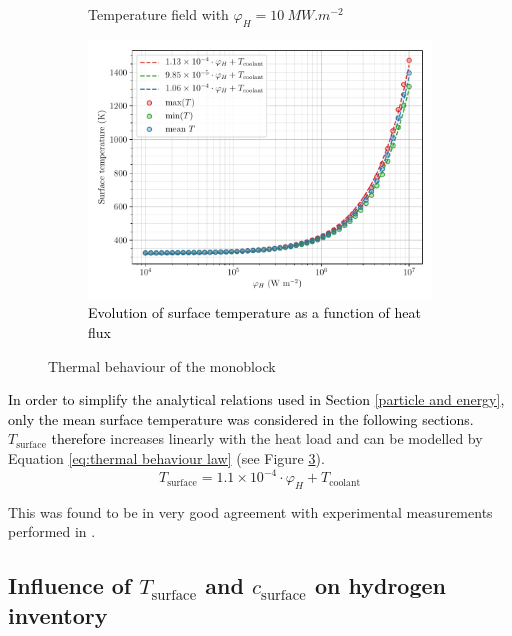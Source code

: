 \begin{figure} [h!]
\begin{subfigure}{0.4\linewidth}
        \caption{Temperature field with $\varphi_H = \SI{10}{MW.m^{-2}}$}
        \label{fig:T field 10 MW}
    \end{subfigure}
    \begin{subfigure}{0.7\linewidth}
        \centering
        \includegraphics[width=\linewidth]{Figures/Chapter3/monoblocks/parametric_study/temperature_phi_H.pdf}
        \caption{\textcolor{black}{Evolution of surface temperature as a function of heat flux}}
        \label{fig:T phi_H}
    \end{subfigure}
    \caption{Thermal behaviour of the monoblock}
\end{figure}

\textcolor{black}{
In order to simplify the analytical relations used in Section \ref{particle and energy}, only the mean surface temperature was considered in the following sections.
}
$T_\mathrm{surface}$ \textcolor{black}{therefore} increases linearly with the heat load and can be modelled by Equation \ref{eq:thermal behaviour law} (see Figure \ref{fig:T phi_H}).
\begin{equation}
    T_\mathrm{surface} = 1.1 \times 10^{-4} \cdot \varphi_H + T_\mathrm{coolant}
    \label{eq:thermal behaviour law}
\end{equation}

This was found to be in very good agreement with experimental measurements performed in \cite{hirai_use_2016}.

\subsection{Influence of \texorpdfstring{$T_\mathrm{surface}$}{Tsurface} and \texorpdfstring{$c_\mathrm{surface}$}{csurface} on hydrogen inventory}

